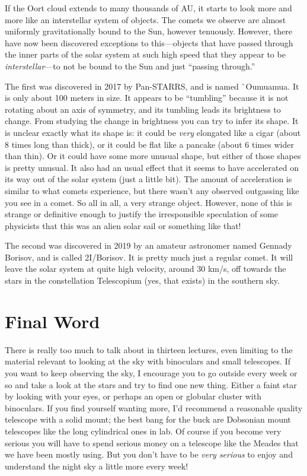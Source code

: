 \documentclass[12pt, preprint]{aastex}
\begin{document}
If the Oort cloud extends to many thousands of AU, it starts to look
more and more like an interstellar system of objects. The comets we
observe are almost uniformly gravitationally bound to the Sun, however
tenuously. However, there have now been discovered exceptions to
this---objects that have passed through the inner parts of the solar
system at such high speed that they appear to be {\it
  interstellar}---to not be bound to the Sun and just ``passing
through.''

The first was discovered in 2017 by Pan-STARRS, and is named
\`{}Oumuamua. It is only about 100 meters in size. It appears to be
``tumbling'' because it is not rotating about an axis of symmetry, and
its tumbling leads its brightness to change. From studying the change
in brightness you can try to infer its shape. It is unclear exactly
what its shape is: it could be {\it very} elongated like a cigar
(about 8 times long than thick), or it could be flat like a pancake
(about 6 times wider than thin). Or it could have some more unusual
shape, but either of those shapes is pretty unusual. It also had an
usual effect that it seems to have accelerated on its way out of the
solar system (just a little bit). The amount of acceleration is
similar to what comets experience, but there wasn't any observed
outgassing like you see in a comet. So all in all, a very strange
object. However, none of this is strange or definitive enough to
justify the irresponsible speculation of some physicists that this was
an alien solar sail or something like that!

The second was discovered in 2019 by an amateur astronomer named
Gennady Borisov, and is called 2I/Borisov. It is pretty much just a
regular comet. It will leave the solar system at quite high velocity,
around 30 km/s, off towards the stars in the constellation Telescopium
(yes, that exists) in the southern sky.

\clearpage
\section{Final Word}

There is really too much to talk about in thirteen lectures, even
limiting to the material relevant to looking at the sky with
binoculars and small telescopes. If you want to keep observing the
sky, I encourage you to go outside every week or so and take a look at
the stars and try to find one new thing. Either a faint star by
looking with your eyes, or perhaps an open or globular cluster with
binoculars. If you find yourself wanting more, I'd recommend a
reasonable quality telescope with a solid mount; the best bang for the
buck are Dobsonian mount telescopes like the long cylindrical ones in
lab. Of course if you become very serious you will have to spend
serious money on a telescope like the Meades that we have been mostly
using. But you don't have to be {\it very serious} to enjoy and
understand the night sky a little more every week!
\end{document}
